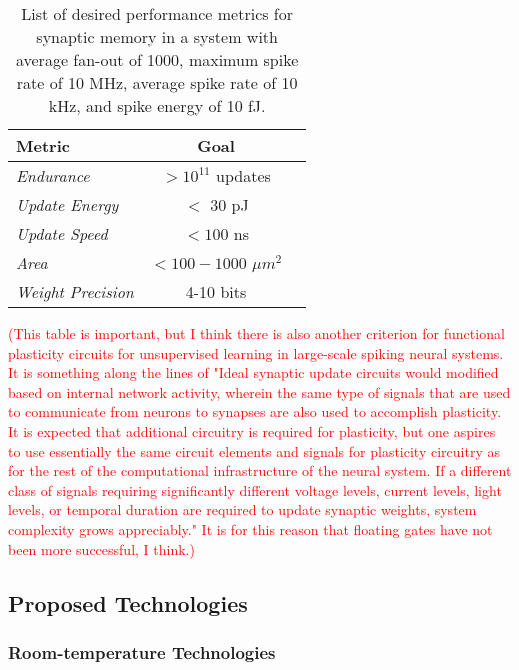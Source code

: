 \documentclass[twocolumn]{article}
\begin{document}
\begin{table}[h!]
  \begin{center}
    \label{tab:memory_metrics}
    \begin{tabular}{l|c|r} %
      \textbf{Metric} & \textbf{Goal} \\
      \hline
      \textit{Endurance} & $>10^{11}$ updates \\
      \textit{Update Energy} & $<$ 30 pJ\\
      \textit{Update Speed} & $<100$ ns \\
      \textit{Area} & $<100-1000$ $\mu m ^2$ \\
      \textit{Weight Precision} & 4-10 bits \cite{pfeil20124}
      
    \end{tabular}
    \caption{List of desired performance metrics for synaptic memory in a system with average fan-out of 1000, maximum spike rate of 10 MHz, average spike rate of 10 kHz, and spike energy of 10 fJ.}
  \end{center}
\end{table}

\textcolor{red}{(This table is important, but I think there is also another criterion for functional plasticity circuits for unsupervised learning in large-scale spiking neural systems. It is something along the lines of "Ideal synaptic update circuits would modified based on internal network activity, wherein the same type of signals that are used to communicate from neurons to synapses are also used to accomplish plasticity. It is expected that additional circuitry is required for plasticity, but one aspires to use essentially the same circuit elements and signals for plasticity circuitry as for the rest of the computational infrastructure of the neural system. If a different class of signals requiring significantly different voltage levels, current levels, light levels, or temporal duration are required to update synaptic weights, system complexity grows appreciably." It is for this reason that floating gates have not been more successful, I think.)}

\subsection{Proposed Technologies}
\subsubsection{Room-temperature Technologies}
\end{document}
